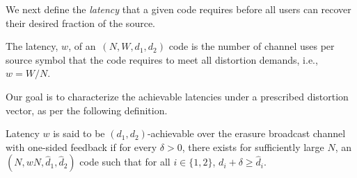%
We next define the {\it latency} that a given code requires before all users can recover their desired fraction of the source.
\begin{mydef}
	The latency, $w$, of an~$(N, W, d_{1}, d_{2})$ code is the number of channel uses per source symbol that the code requires to meet all distortion demands, i.e., $w = W/N$.
\end{mydef}
%
Our goal is to characterize the achievable latencies under a prescribed distortion vector,
as per the following definition.
\begin{mydef}
\label{def:achievable_one_sided}
	Latency $w$ is said to be $(d_{1}, d_{2})$-achievable over the erasure broadcast channel with one-sided feedback if for every $\delta > 0$, there exists for sufficiently large $N$, an $(N, wN, \hat{d}_{1}, \hat{d}_{2})$ code such that for all $i \in \{1, 2\}$, $d_{i}+\delta \geq \hat{d}_{i}$.
	
	

\end{mydef}


